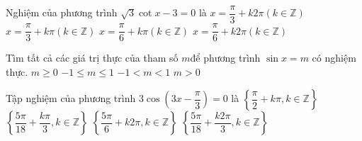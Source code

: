 \begin{ex}%
	Nghiệm của phương trình $\sqrt{3}\cot x-3=0$ là	
	\choice
	{$x=\dfrac{\pi }{3}+k2\pi \left( k\in \mathbb{Z} \right)$}
	{$x=\dfrac{\pi }{3}+k\pi \left( k\in \mathbb{Z} \right)$}
	{\True $x=\dfrac{\pi }{6}+k\pi \left( k\in \mathbb{Z} \right)$}
	{$x=\dfrac{\pi }{6}+k2\pi \left( k\in \mathbb{Z} \right)$}
\end{ex}

\begin{ex}%
	Tìm tất cả các giá trị thực của tham số $m$để phương trình $\sin x=m$ có nghiệm thực.	
	\choice
	{$m\ge 0$}
	{\True $-1\le m\le 1$}
	{$-1<m<1$}
	{$m>0$}
\end{ex}

\begin{ex}%
	Tập nghiệm của phương trình $3\cos\left( 3x-\dfrac{\pi }{3} \right)=0$ là
	\choice
	{$\left\{ \dfrac{\pi }{2}+k\pi ,k\in \mathbb{Z} \right\}$}
	{\True $\left\{ \dfrac{5\pi }{18}+\dfrac{k\pi }{3},k\in \mathbb{Z} \right\}$}
	{$\left\{ \dfrac{5\pi }{6}+k2\pi ,k\in \mathbb{Z} \right\}$}
	{$\left\{ \dfrac{5\pi }{18}+\dfrac{k2\pi }{3},k\in \mathbb{Z} \right\}$}
\end{ex}

